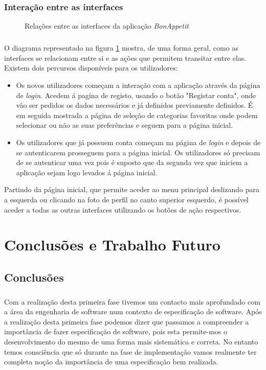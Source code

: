 \documentclass[a4paper,12pt]{scrreprt}
\begin{document}
\subsection{Interação entre as interfaces}
\begin{figure}[htp]
    \centering
    \caption{Relações entre as interfaces da aplicação \textit{BonAppetit}}
    \label{fig:relacoesentreinterfaces}
\end{figure}
\paragraph{}
O diagrama representado na figura \ref{fig:relacoesentreinterfaces} mostra, de uma forma geral, como as interfaces se relacionam entre si e as ações que permitem transitar entre elas.
Existem dois percursos disponíveis para os utilizadores:
\begin{itemize}
    \item Os novos utilizadores começam a interação com a aplicação através da página de \textit{login}. Acedem á pagina de registo, usando o botão "Registar conta", onde vão ser pedidos os dados necessários e já definidos previamente definidos. É em seguida mostrada a página de seleção de categorias favoritas onde podem selecionar ou não as suas preferências e seguem para a página inicial.
    \item Os utilizadores que já possuem conta começam na página de \textit{login} e depois de se autenticarem prosseguem para a página inicial. Os utilizadores só precisam de se autenticar uma vez pois é suposto que da segunda vez que iniciem a aplicação sejam logo levados á página inicial.
\end{itemize}
Partindo da página inicial, que permite aceder ao menu principal deslizando para a esquerda ou clicando na foto de perfil no canto superior esquerdo, é possível aceder a todas as outras interfaces utilizando os botões de ação respectivos.

\chapter{Conclusões e Trabalho Futuro}


\section{Conclusões}
\paragraph{}
Com a realização desta primeira fase tivemos um contacto mais aprofundado com a área da engenharia de software num contexto de especificação de software.
Após a realização desta primeira fase podemos dizer que passamos a compreender a importância de fazer especificação de software, pois esta permite-mos o desenvolvimento do mesmo de uma forma mais sistemática e correta. No entanto temos consciência que só durante na fase de implementação vamos realmente ter completa noção da importância de uma especificação bem realizada.
\end{document}
